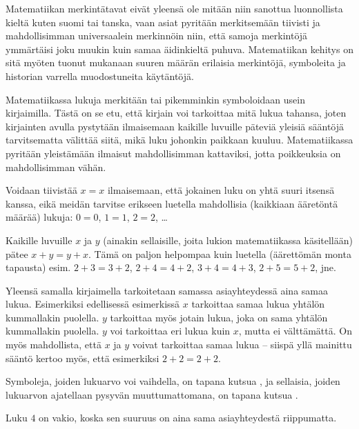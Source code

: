 Matematiikan merkintätavat eivät yleensä ole mitään niin sanottua luonnollista kieltä kuten suomi tai tanska, vaan asiat pyritään merkitsemään tiivisti ja mahdollisimman universaalein merkinnöin niin, että samoja merkintöjä ymmärtäisi joku muukin kuin samaa äidinkieltä puhuva. Matematiikan kehitys on sitä myöten tuonut mukanaan suuren määrän erilaisia merkintöjä, symboleita ja historian varrella muodostuneita käytäntöjä.

Matematiikassa lukuja merkitään tai pikemminkin symboloidaan usein kirjaimilla. Tästä on se etu, että kirjain voi tarkoittaa mitä lukua tahansa, joten kirjainten avulla pystytään ilmaisemaan kaikille luvuille päteviä yleisiä sääntöjä tarvitsematta välittää siitä, mikä luku johonkin paikkaan kuuluu. Matematiikassa pyritään yleistämään ilmaisut mahdollisimman kattaviksi, jotta poikkeuksia on mahdollisimman vähän.

\begin{esimerkki}
Voidaan tiivistää $x=x$ ilmaisemaan, että jokainen luku on yhtä suuri itsensä kanssa, eikä meidän tarvitse erikseen luetella mahdollisia (kaikkiaan ääretöntä määrää) lukuja: $0=0$, $1=1$, $2=2$, \ldots
\end{esimerkki}

\begin{esimerkki}
Kaikille luvuille $x$ ja $y$ (ainakin sellaisille, joita lukion matematiikassa käsitellään) pätee $x+y=y+x$. Tämä on paljon helpompaa kuin luetella (äärettömän monta tapausta) esim. $2+3=3+2$, $2+4=4+2$, $3+4=4+3$, $2+5=5+2$, jne.
\end{esimerkki}

Yleensä samalla kirjaimella tarkoitetaan samassa asiayhteydessä aina samaa lukua. Esimerkiksi edellisessä esimerkissä $x$ tarkoittaa samaa lukua yhtälön kummallakin puolella. $y$ tarkoittaa myös jotain lukua, joka on sama yhtälön kummallakin puolella. $y$ voi tarkoittaa eri lukua kuin $x$, mutta ei välttämättä. On myös mahdollista, että $x$ ja $y$ voivat tarkoittaa samaa lukua – siispä yllä mainittu sääntö kertoo myös, että esimerkiksi $2+2=2+2$. 

Symboleja, joiden lukuarvo voi vaihdella, on tapana kutsua , ja sellaisia, joiden lukuarvon ajatellaan pysyvän muuttumattomana, on tapana kutsua .

\begin{esimerkki}
Luku $4$ on vakio, koska sen suuruus on aina sama asiayhteydestä riippumatta. \\
\end{esimerkki}


